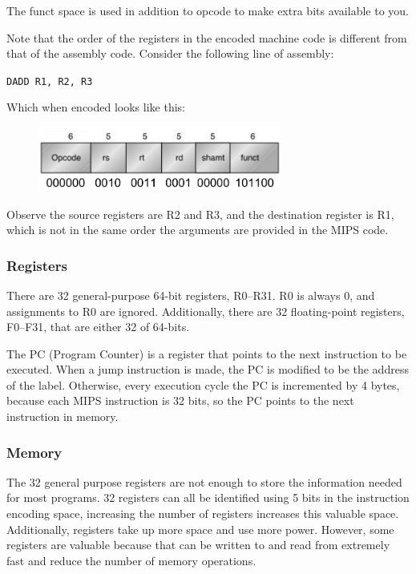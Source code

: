 \documentclass{article}
\begin{document}
The funct space is used in addition to opcode to make extra bits available to you.

Note that the order of the registers in the encoded machine code is different from that of the assembly code. Consider the following line of assembly: 

 \texttt{DADD R1, R2, R3}

Which when encoded looks like this:

\begin{figure}[ht!]
\centering
\includegraphics[width=80mm]{img/TranslatedInto.png}
\end{figure}

Observe the source registers are R2 and R3, and the destination register is R1, which is not in the same order the arguments are provided in the MIPS code.

\subsubsection{Registers}

There are 32 general-purpose 64-bit registers, R0--R31. R0 is always 0, and assignments to R0 are ignored. Additionally, there are 32 floating-point registers, F0--F31, that are either 32 of 64-bits.

The PC (Program Counter) is a register that points to the next instruction to be executed. When a jump instruction is made, the PC is modified to be the address of the label. Otherwise, every execution cycle the PC is incremented by 4 bytes, because each MIPS instruction is 32 bits, so the PC points to the next instruction in memory.

\subsubsection{Memory}

The 32 general purpose registers are not enough to store the information needed for most programs. 32 registers can all be identified using 5 bits in the instruction encoding space, increasing the number of registers increases this valuable space. Additionally, registers take up more space and use more power. However, some registers are valuable because that can be written to and read from extremely fast and reduce the number of memory operations.
\end{document}
